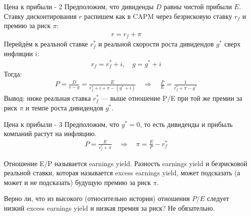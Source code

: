 \documentclass{beamer}
\begin{document}
\begin{frame}{Цена к прибыли - 2}
\justify
Предположим, что дивиденды $D$ равны чистой прибыли $E$. Ставку дисконтирования $r$ распишем как в CAPM через безрисковую ставку $r_f$ и премию за риск $\pi$:
\begin{align*}
r = r_f + \pi
\end{align*}
Перейдём к реальной ставке $r_f^*$ и реальной скорости роста дивидендов $g^*$ сверх инфляции $i$:
\begin{align*}
r_f = r_f^* + i, \quad g = g^* + i
\end{align*}
Тогда:
\begin{align*}
P = \frac{D}{r - g} = \frac{E}{r_f^* + i + \pi - (g^* + i)} \quad\Rightarrow\quad \frac{P}{E} = \frac{1}{r_f^* + \pi - g^*}
\end{align*}
Вывод: ниже реальная ставка $r_f^*$ --- выше отношение P/E при той же премии за риск $\pi$ и темпе роста дивидендов $g^*$.
\end{frame}



\begin{frame}{Цена к прибыли - 3}
\justify
Предположим, что $g^* = 0$, то есть дивиденды и прибыль компаний растут на инфляцию.
\begin{align*}
P = \frac{E}{r_f^* + \pi} \quad\Rightarrow\quad \pi = \frac{E}{P} - r_f^*
\end{align*}

\justify
Отношение E/P называется earnings yield. Разность earnings yield и безрисковой реальной ставки, которая называется excess earnings yield, может подсказать (а может и не подсказать) будущую премию за риск $\pi$.

\justify
Верно ли, что из высокого (относительно истории) отношения $P/E$ следует низкий excess earnings yield и низкая премия за риск? Не обязательно.
\end{frame}
\end{document}
